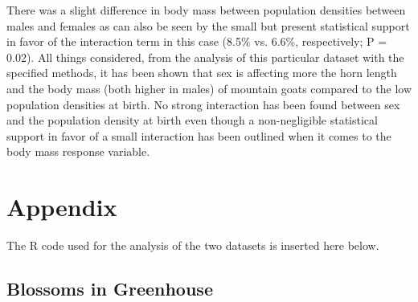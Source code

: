 \documentclass{article}
\begin{document}
\fi
There was a slight difference in body mass between population densities between males and females as can also be seen by the small but present statistical support in favor of the interaction term in this case (8.5\% vs. 6.6\%, respectively; P = 0.02).
All things considered, from the analysis of this particular dataset with the specified methods, it has been shown that sex is affecting more the horn length and the body mass (both higher in males) of mountain goats compared to the low population densities at birth. No strong interaction has been found between sex and the population density at birth even though a non-negligible statistical support in favor of a small interaction has been outlined when it comes to the body mass response variable.

\section{Appendix} \label{Appendix}
The R code used for the analysis of the two datasets is inserted here below.
\subsection{Blossoms in Greenhouse}
\end{document}
